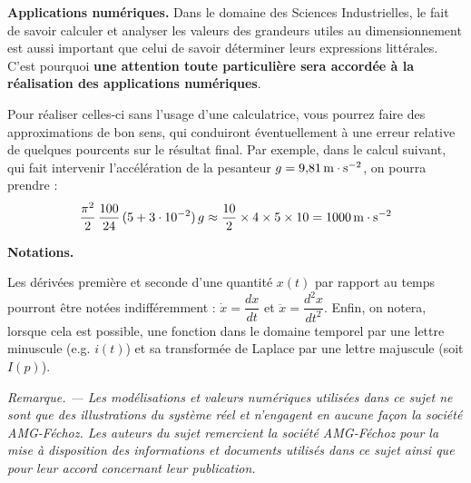 \textbf{Applications numériques.} Dans le domaine des Sciences Industrielles, le fait de savoir calculer et analyser les valeurs des grandeurs utiles au dimensionnement est aussi important que celui de savoir déterminer leurs expressions littérales. C'est pourquoi \textbf{une attention toute particulière sera accordée à la réalisation des applications numériques}.

Pour réaliser celles-ci sans l'usage d'une calculatrice, vous pourrez faire des approximations de bon sens, qui conduiront éventuellement à une erreur relative de quelques pourcents sur le résultat final. Par exemple, dans le calcul suivant, qui fait intervenir l'accélération de la pesanteur $g=9{,}81\,\mathrm{m\cdot s^{-2}}$, on pourra prendre :
\[
\dfrac{\pi^2}{2}\,\dfrac{100}{24}\,(5+3\cdot 10^{-2})\,g\approx \dfrac{10}{2}\times 4\times 5\times 10=1000\,\mathrm{m\cdot s^{-2}}
\]

\textbf{Notations.} 

Les dérivées première et seconde d'une quantité $x(t)$ par rapport au temps pourront être notées indifféremment : $\dot{x}=\dfrac{dx}{dt}$ et $\ddot{x}=\dfrac{d^2x}{dt^2}$. Enfin, on notera, lorsque cela est possible, une fonction dans le domaine temporel par une lettre minuscule (e.g. $i(t)$) et sa transformée de Laplace par une lettre majuscule (soit $I(p)$).

\emph{Remarque. --- Les modélisations et valeurs numériques utilisées dans ce sujet ne sont que des illustrations du système réel et n'engagent en aucune façon la société AMG-Féchoz. Les auteurs du sujet remercient la société AMG-Féchoz pour la mise à disposition des informations et documents utilisés dans ce sujet ainsi que pour leur accord concernant leur publication.}

